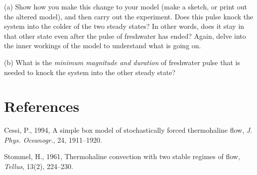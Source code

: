 \documentclass[11pt,letterpaper]{article}
\begin{document}
(a) Show how you make this change to your model (make a sketch, or print out the altered model), and then carry out the experiment. Does this pulse knock the system into the colder of the two steady states? In other words, does it stay in that other state even after the pulse of freshwater has ended? Again, delve into the inner workings of the model to understand what is going on.

(b) What is the \textit{minimum magnitude and duration} of freshwater pulse that is needed to knock the system into the other steady state?



\section{References}
Cessi, P., 1994, A simple box model of stochastically forced thermohaline flow, \textit{J. Phys. Oceanogr.}, 24, 1911--1920.

Stommel, H., 1961, Thermohaline convection with two stable regimes of flow, \textit{Tellus}, 13(2), 224--230.
\end{document}
